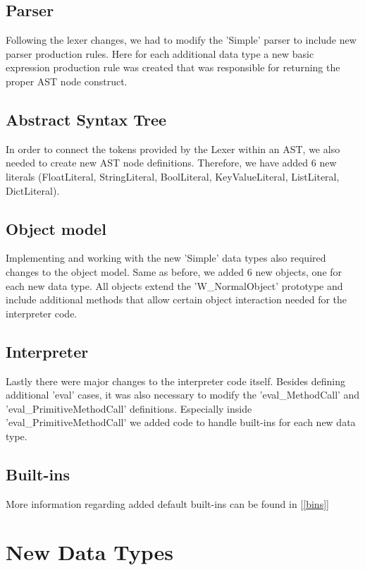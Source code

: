 \documentclass{article}
\begin{document}
\subsection{Parser}
Following the lexer changes, we had to modify the 'Simple' parser to include new parser production rules. Here for each additional data type a new basic expression production rule was created that was responsible for returning the proper AST node construct.

\subsection{Abstract Syntax Tree}
In order to connect the tokens provided by the Lexer within an AST, we also needed to create new AST node definitions. Therefore, we have added 6 new literals (FloatLiteral, StringLiteral, BoolLiteral, KeyValueLiteral, ListLiteral, DictLiteral).

\subsection{Object model}
Implementing and working with the new 'Simple' data types also required changes to the object model. Same as before, we added 6 new objects, one for each new data type. All objects extend the 'W\_NormalObject' prototype and include additional methods that allow certain object interaction needed for the interpreter code.

\subsection{Interpreter}
Lastly there were major changes to the interpreter code itself. Besides defining additional 'eval' cases, it was also necessary to modify the 'eval\_MethodCall' and 'eval\_PrimitiveMethodCall' definitions. Especially inside 'eval\_PrimitiveMethodCall' we added code to handle built-ins for each new data type.


\subsection{Built-ins}
More information regarding added default built-ins can be found in [\ref{bins}]


\section{New Data Types}
\end{document}
